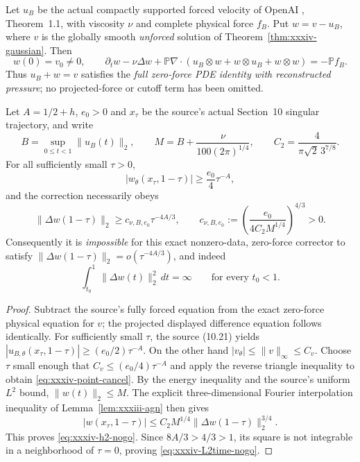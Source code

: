 \begin{theorem}
\label{thm:xxxiv-h2-obstruction}
Let $u_B$ be the actual compactly supported forced
velocity of OpenAI \cite{openai2026}, Theorem~1.1,
with viscosity $\nu$ and complete physical force $f_B$.
Put $w=v-u_B$, where $v$ is the globally smooth
\emph{unforced} solution of
Theorem~\ref{thm:xxxiv-gaussian}. Then
\[
w(0)=v_0\ne0,\qquad
\partial_tw-\nu\Delta w+
\mathbb P\nabla\cdot
(u_B\otimes w+w\otimes u_B+w\otimes w)
=-\mathbb P f_B.
\]
Thus $u_B+w=v$ satisfies the \emph{full zero-force PDE
identity with reconstructed pressure}; no projected-force
or cutoff term has been omitted.

Let $A=1/2+h$, $e_0>0$ and $x_\tau$ be the source's
actual Section~10 singular trajectory,
and write
\[
B=\sup_{0\le t<1}\|u_B(t)\|_2,\qquad
M=B+\frac{\nu}{100(2\pi)^{1/4}},\qquad
C_2=\frac4{\pi\sqrt2\,3^{7/8}}.
\]
For all sufficiently small $\tau>0$,
\begin{equation}\label{eq:xxxiv-point-cancel}
|w_\theta(x_\tau,1-\tau)|
\ge\frac{e_0}{4}\tau^{-A},
\end{equation}
and the correction necessarily obeys
\begin{equation}\label{eq:xxxiv-h2-nogo}
\boxed{\quad
\|\Delta w(1-\tau)\|_2
\ge c_{\nu,B,e_0}\tau^{-4A/3},\qquad
c_{\nu,B,e_0}:=
\left(\frac{e_0}{4C_2 M^{1/4}}\right)^{4/3}>0.
\quad}
\end{equation}
Consequently it is \emph{impossible} for this exact
nonzero-data, zero-force corrector to satisfy
$\|\Delta w(1-\tau)\|_2=o(\tau^{-4A/3})$,
and indeed
\begin{equation}\label{eq:xxxiv-L2time-nogo}
\boxed{\quad
\int_{t_0}^{1}\|\Delta w(t)\|_2^2\,dt=\infty
\qquad\text{for every }t_0<1.\quad}
\end{equation}
\end{theorem}
\begin{proof}
Subtract the source's fully forced equation from the exact
zero-force physical equation for $v$; the projected displayed
difference equation follows identically.
For sufficiently small $\tau$, the source (10.21) yields
$|u_{B,\theta}(x_\tau,1-\tau)|
\ge(e_0/2)\tau^{-A}$. On the other hand
$|v_\theta|\le\|v\|_\infty\le C_v$.
Choose $\tau$ small enough that
$C_v\le(e_0/4)\tau^{-A}$ and apply the reverse
triangle inequality to obtain \eqref{eq:xxxiv-point-cancel}.
By the energy inequality and the source's uniform $L^2$
bound, $\|w(t)\|_2\le M$.
The explicit three-dimensional Fourier interpolation inequality
of Lemma~\ref{lem:xxxiii-agn} then gives
\[
|w(x_\tau,1-\tau)|
\le C_2 M^{1/4}\|\Delta w(1-\tau)\|_2^{3/4}.
\]
This proves \eqref{eq:xxxiv-h2-nogo}.
Since $8A/3>4/3>1$, its square is not integrable
in a neighborhood of $\tau=0$, proving
\eqref{eq:xxxiv-L2time-nogo}.
\end{proof}

